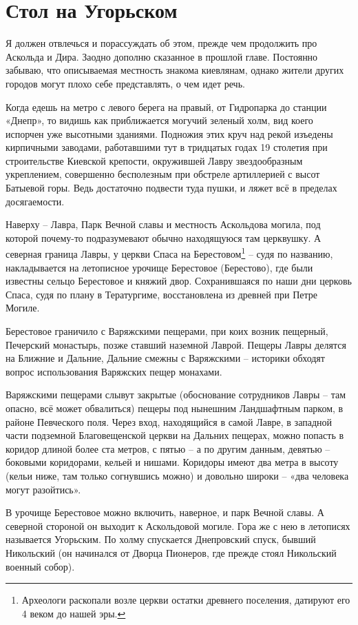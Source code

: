 \chapter{Стол на Угорьском}

Я должен отвлечься и порассуждать об этом, прежде чем продолжить про Аскольда и Дира. Заодно дополню сказанное в прошлой главе. Постоянно забываю, что описываемая местность знакома киевлянам, однако жители других городов могут плохо себе представлять, о чем идет речь.

Когда едешь на метро с левого берега на правый, от Гидропарка до станции «Днепр», то видишь как приближается могучий зеленый холм, вид коего испорчен уже высотными зданиями. Подножия этих круч над рекой изъедены кирпичными заводами, работавшими тут в тридцатых годах 19 столетия при строительстве Киевской крепости, окружившей Лавру звездообразным укреплением, совершенно бесполезным при обстреле артиллерией с высот Батыевой горы. Ведь достаточно подвести туда пушки, и ляжет всё в пределах досягаемости.

Наверху – Лавра, Парк Вечной славы и местность Аскольдова могила, под которой почему-то подразумевают обычно находящуюся там церквушку. А северная граница Лавры, у церкви Спаса на Берестовом\footnote{Археологи раскопали возле церкви остатки древнего поселения, датируют его 4 веком до нашей эры.} – судя по названию, накладывается на летописное урочище Берестовое (Берестово), где были известны сельцо Берестовое и княжий двор. Сохранившаяся по наши дни церковь Спаса, судя по плану в Тератургиме, восстановлена из древней при Петре Могиле.

Берестовое граничило с Варяжскими пещерами, при коих возник пещерный, Печерский монастырь, позже ставший наземной Лаврой. Пещеры Лавры делятся на Ближние и Дальние, Дальние смежны с Варяжскими – историки обходят вопрос использования Варяжских пещер монахами.

Варяжскими пещерами слывут закрытые (обоснование сотрудников Лавры – там опасно, всё может обвалиться) пещеры под нынешним Ландшафтным парком, в районе Певческого поля. Через вход, находящийся в самой Лавре, в западной части подземной Благовещенской церкви на Дальних пещерах, можно попасть в коридор длиной более ста метров, с пятью – а по другим данным, девятью – боковыми коридорами, кельей и нишами. Коридоры имеют два метра в высоту (кельи ниже, там только согнувшись можно) и довольно широки – «два человека могут разойтись».

В урочище Берестовое можно включить, наверное, и парк Вечной славы. А северной стороной он выходит к Аскольдовой могиле. Гора же с нею в летописях называется Угорьским. По холму спускается Днепровский спуск, бывший Никольский (он начинался от Дворца Пионеров, где прежде стоял Никольский военный собор).


